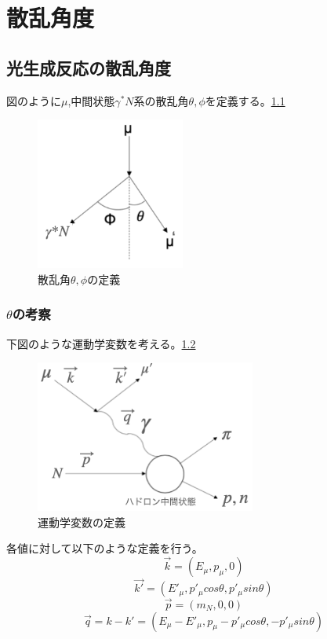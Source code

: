 \chapter{散乱角度}\label{cha:angle}
\section{光生成反応の散乱角度}
図のように$\mu$,中間状態$\gamma^*N$系の散乱角$\theta, \phi$を定義する。\ref{fig:angle1}
\begin{figure}[H]
    \centering
    \includegraphics[height=5cm]{img/angle_diagram.png}
    \caption{散乱角$\theta, \phi$の定義}
    \label{fig:angle1}
\end{figure}

\subsection{$\theta$の考察}
下図のような運動学変数を考える。\ref{fig:angle2}
\begin{figure}[H]
    \centering
    \includegraphics[height=5cm]{img/diagram_3momentum.png}
    \caption{運動学変数の定義}
    \label{fig:angle2}
\end{figure}

各値に対して以下のような定義を行う。
\begin{equation}
    \vec{k} = (E_\mu , p_\mu,0)
\end{equation}
\begin{equation}
    \vec{k'} = (E'_\mu, p'_\mu cos\theta, p'_\mu sin\theta)
\end{equation}
\begin{equation}
    \vec{p} = (m_N, 0, 0)
\end{equation}
\begin{equation}
    \vec{q} = k-k'=(E_\mu - E'_\mu, p_\mu-p'_\mu cos\theta, -p'_\mu sin\theta)
\end{equation}

